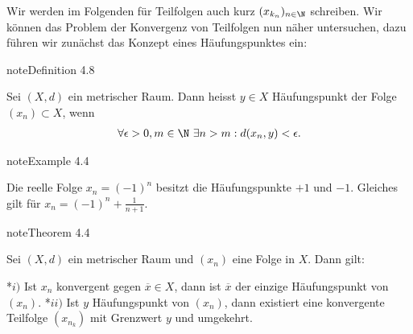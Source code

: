 \documentclass[letterpaper,10pt,english]{jupyterBook}
\begin{document}
Wir werden im Folgenden für Teilfolgen auch kurz \((x_{k_n})_{n \in \N}\) schreiben.
Wir können das Problem der Konvergenz von Teilfolgen nun näher untersuchen, dazu führen wir zunächst das Konzept eines Häufungspunktes ein:
\label{metrik/teilfolgen:definition-1}
\begin{sphinxadmonition}{note}{Definition 4.8}



Sei \((X,d)\) ein metrischer Raum. Dann heisst \(y \in X\) Häufungspunkt der Folge \((x_n) \subset X\), wenn
\begin{equation*}
\begin{split} \forall \epsilon > 0, m \in \N ~\exists n > m: d(x_n,y) < \epsilon.\end{split}
\end{equation*}\end{sphinxadmonition}
\label{metrik/teilfolgen:example-2}
\begin{sphinxadmonition}{note}{Example 4.4}



Die reelle Folge \(x_n = (-1)^n\) besitzt die Häufungspunkte \(+1\) und \(-1\). Gleiches gilt für \(x_n = (-1)^n + \frac{1}{n+1}\).
\end{sphinxadmonition}
\label{metrik/teilfolgen:theorem-3}
\begin{sphinxadmonition}{note}{Theorem 4.4}



Sei \((X,d)\) ein metrischer Raum und \((x_n)\) eine Folge in \(X\). Dann gilt:

*\(i)\) Ist \(x_n\) konvergent gegen \(\overline{x} \in X\), dann ist \(\overline{x}\) der einzige Häufungspunkt von \((x_n)\).
*\(ii)\) Ist \(y\) Häufungspunkt von \((x_n)\), dann existiert eine konvergente Teilfolge \((x_{n_k})\) mit Grenzwert \(y\) und umgekehrt.
\end{sphinxadmonition}
\end{document}
